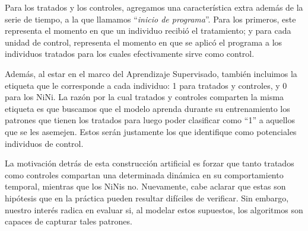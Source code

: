 \documentclass[../../main.tex]{subfiles}
\begin{document}
Para los tratados y los controles, agregamos una característica extra además de la serie
de tiempo, a la que llamamos ``\textit{inicio de programa}''. Para los primeros, este
representa el momento en que un individuo recibió el tratamiento; y para cada unidad de
control, representa el momento en que se aplicó el programa a los individuos tratados para
los cuales efectivamente sirve como control.

Además, al estar en el marco del Aprendizaje Supervisado, también incluimos la etiqueta
que le corresponde a cada individuo: 1 para tratados y controles, y 0 para los NiNi. La
razón por la cual tratados y controles comparten la misma etiqueta es que buscamos que el
modelo aprenda durante su entrenamiento los patrones que tienen los tratados para luego
poder clasificar como ``1'' a aquellos que se les asemejen. Estos serán justamente los que
identifique como potenciales individuos de control.

La motivación detrás de esta construcción artificial es forzar que tanto tratados como
controles compartan una determinada dinámica en su comportamiento temporal, mientras que
los NiNis no. Nuevamente, cabe aclarar que estas son hipótesis que en la práctica pueden
resultar difíciles de verificar. Sin embargo, nuestro interés radica en evaluar si, al
modelar estos supuestos, los algoritmos son capaces de capturar tales patrones.
\end{document}
